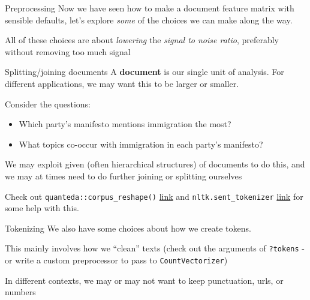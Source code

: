 \documentclass[
  10pt,
  ignorenonframetext,
  aspectratio=169]{beamer}
\providecommand{\tightlist}{%
  \setlength{\itemsep}{0pt}\setlength{\parskip}{0pt}}
\begin{document}
\begin{frame}{Preprocessing}
\protect\hypertarget{preprocessing}{}
Now we have seen how to make a document feature matrix with sensible
defaults, let's explore \emph{some} of the choices we can make along the
way.

All of these choices are about \emph{lowering} the \emph{signal to noise
ratio}, preferably without removing too much signal
\end{frame}

\begin{frame}[fragile]{Splitting/joining documents}
\protect\hypertarget{splittingjoining-documents}{}
A \textbf{document} is our single unit of analysis. For different
applications, we may want this to be larger or smaller.

Consider the questions:

\begin{itemize}
\tightlist
\item
  Which party's manifesto mentions immigration the most?
\item
  What topics co-occur with immigration in each party's manifesto?
\end{itemize}

We may exploit given (often hierarchical structures) of documents to do
this, and we may at times need to do further joining or splitting
ourselves

Check out \texttt{quanteda::corpus\_reshape()}
\href{https://tutorials.quanteda.io/basic-operations/corpus/corpus_reshape/}{link}
and \texttt{nltk.sent\_tokenizer}
\href{https://www.nltk.org/api/nltk.tokenize.html}{link} for some help
with this.
\end{frame}

\begin{frame}[fragile]{Tokenizing}
\protect\hypertarget{tokenizing}{}
We also have some choices about how we create tokens.

This mainly involves how we ``clean'' texts (check out the arguments of
\texttt{?tokens} - or write a custom preprocessor to pass to
\texttt{CountVectorizer})

In different contexts, we may or may not want to keep punctuation, urls,
or numbers
\end{frame}
\end{document}
